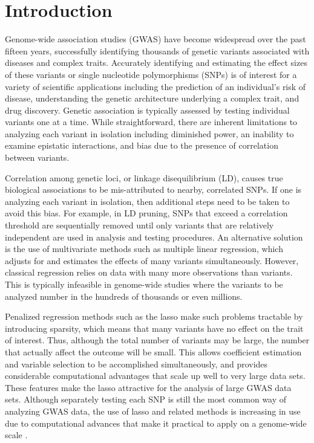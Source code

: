 
\section{Introduction}

Genome-wide association studies (GWAS) have become widespread over the past fifteen years, successfully identifying thousands of genetic variants associated with diseases and complex traits. Accurately identifying and estimating the effect sizes of these variants or single nucleotide polymorphisms (SNPs) is of interest for a variety of scientific applications including the prediction of an individual's risk of disease, understanding the genetic architecture underlying a complex trait, and drug discovery. Genetic association is typically assessed by testing individual variants one at a time.  While straightforward, there are inherent limitations to analyzing each variant in isolation including diminished power, an inability to examine epistatic interactions, and bias due to the presence of correlation between variants.

Correlation among genetic loci, or linkage disequilibrium (LD), causes true biological associations to be mis-attributed to nearby, correlated SNPs. If one is analyzing each variant in isolation, then additional steps need to be taken to avoid this bias.  For example, in LD pruning, SNPs that exceed a correlation threshold are sequentially removed until only variants that are relatively independent are used in analysis and testing procedures. An alternative solution is the use of multivariate methods such as multiple linear regression, which adjusts for and estimates the effects of many variants simultaneously. However, classical regression relies on data with many more observations than variants. This is typically infeasible in genome-wide studies where the variants to be analyzed number in the hundreds of thousands or even millions.

Penalized regression methods such as the lasso \citep{tibshirani1996regression} make such problems tractable by introducing sparsity, which means that many variants have no effect on the trait of interest. Thus, although the total number of variants may be large, the number that actually affect the outcome will be small. This allows coefficient estimation and variable selection to be accomplished simultaneously, and provides considerable computational advantages that scale up well to very large data sets. These features make the lasso attractive for the analysis of large GWAS data sets. Although separately testing each SNP is still the most common way of analyzing GWAS data, the use of lasso and related methods is increasing in use due to computational advances that make it practical to apply on a genome-wide scale \citep{qian2020fast, prive2018efficient}. 

